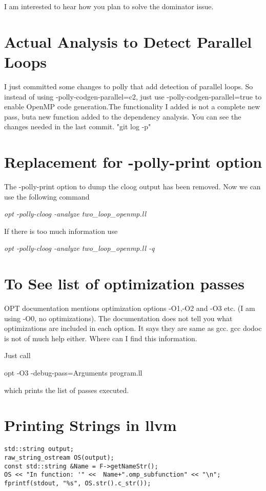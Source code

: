 \documentclass[a4paper,10pt]{article}
\begin{document}
I am interested to hear how you plan to solve the dominator issue.
\section{Actual Analysis to Detect Parallel Loops}

I just committed some changes to polly that add detection of parallel loops. So instead of using -polly-codgen-parallel=c2, just use -polly-codgen-parallel=true to enable OpenMP code generation.The functionality I added is not a complete new pass, buta new function added to the dependency analysis. You can see the changes needed in the last commit. "git log -p"



\section{Replacement for -polly-print option}

The -polly-print option to dump the cloog output has been removed. Now we can use the following command

\emph{opt -polly-cloog -analyze two\_loop\_openmp.ll}

If there is too much information use

\emph{opt -polly-cloog -analyze two\_loop\_openmp.ll -q}

\section{To See list of optimization passes}

OPT documentation mentions optimization options -O1,-O2 and -O3 etc.
(I am using -O0, no optimizations). The documentation does not tell
 you what optimizations are included in each option.  It says they are
 same as gcc.  gcc dodoc is not of much help either.  Where can I find
 this information.

Just call

opt -O3 -debug-pass=Arguments program.ll

which prints the list of passes executed.

\section{Printing Strings in llvm}

\begin{verbatim}
std::string output;
raw_string_ostream OS(output);
const std::string &Name = F->getNameStr();
OS << "In function: '" <<  Name+".omp_subfunction" << "\n";
fprintf(stdout, "%s", OS.str().c_str());

\end{verbatim}
\end{document}
